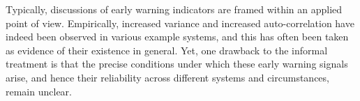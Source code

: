 Typically, discussions of early warning indicators are framed within an applied point of view. Empirically, increased variance and increased auto-correlation have indeed been observed in various example systems, and this has often been taken as evidence of their existence in general. Yet, one drawback to the informal treatment is that the precise conditions under which these early warning signals arise, and hence their reliability across different systems and circumstances, remain unclear. 




	
